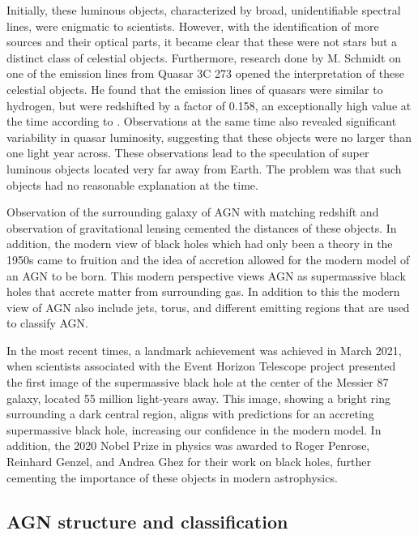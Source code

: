 Initially, these luminous objects, characterized by broad, 
unidentifiable spectral lines, were enigmatic to scientists. 
However, with the identification of more sources and their optical parts, 
it became clear that these were not stars but a distinct class of celestial objects. 
Furthermore, research done by M. Schmidt on one of the emission lines from 
Quasar 3C 273 opened the interpretation of these celestial objects. 
He found that the emission lines of quasars were similar to hydrogen, but were redshifted by a factor of 0.158,
an exceptionally high value at the time according to \cite{Shields_1999}. Observations at the same time also revealed significant 
variability in quasar luminosity, suggesting that these objects were no larger than one light year across. 
These observations lead to the speculation of super luminous objects located very far away from Earth. The problem was that such objects
had no reasonable explanation at the time. %

Observation of the surrounding galaxy of AGN with matching redshift and observation of gravitational lensing cemented 
the distances of these objects. In addition, the modern view of black holes which had only been a theory in the 1950s came to
fruition and the idea of accretion allowed for the modern model of an AGN to be born. This modern perspective views AGN as supermassive black holes that
accrete matter from surrounding gas. In addition to this the modern view of AGN also include jets, torus, and different emitting regions that are used to classify AGN.

In the most recent times, a landmark achievement was achieved in March 2021, when scientists associated with the Event Horizon Telescope project 
presented the first image of the supermassive black hole at the center of the Messier 87 galaxy, located 55 million light-years away.
This image, showing a bright ring surrounding a dark central region, aligns with predictions for an accreting supermassive black hole, 
increasing our confidence in the modern model. In addition, the 2020 Nobel Prize in physics was awarded to Roger Penrose, Reinhard Genzel, and Andrea Ghez for their work on black holes, 
further cementing the importance of these objects in modern astrophysics.





\subsection{AGN structure and classification}


